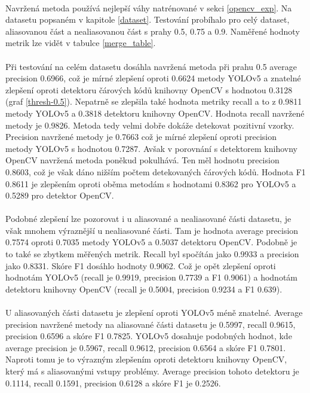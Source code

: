 \paragraph{} Navržená metoda používá nejlepší váhy natrénované v sekci \ref{opencv_exp}. Na datasetu popsaném v kapitole \ref{dataset}. Testování probíhalo pro celý dataset, aliasovanou část a nealiasovanou část s prahy 0.5, 0.75 a 0.9. Naměřené hodnoty metrik lze vidět v tabulce \ref{merge_table}.
\paragraph{} Při testování na celém datasetu dosáhla navržená metoda při prahu 0.5 average precision 0.6966, což je mírné zlepšení oproti 0.6624 metody YOLOv5 a znatelné zlepšení oproti detektoru čárových kódů knihovny OpenCV s hodnotou 0.3128 (graf \ref{thresh-0.5}). Nepatrně se zlepšila také hodnota metriky recall a to z 0.9811 metody YOLOv5 a 0.3818 detektoru knihovny OpenCV. Hodnota recall navržené metody je 0.9826. Metoda tedy velmi dobře dokáže detekovat pozitivní vzorky. Precision navržené metody je 0.7663 což je mírné zlepšení oproti precision metody YOLOv5 s hodnotou 0.7287. Avšak v porovnání s detektorem knihovny OpenCV navržená metoda poněkud pokulhává. Ten měl hodnotu precision 0.8603, což je však dáno nižším počtem detekovaných čárových kódů. Hodnota F1 0.8611 je zlepšením oproti oběma metodám s hodnotami 0.8362 pro YOLOv5 a 0.5289 pro detektor OpenCV.

\paragraph{} Podobné zlepšení lze pozorovat i u aliasované a nealiasované části datasetu, je však mnohem výraznější u nealiasované části. Tam je hodnota average precision 0.7574 oproti 0.7035 metody YOLOv5 a 0.5037 detektoru OpenCV. Podobně je to také se zbytkem měřených metrik. Recall byl spočítán jako 0.9933 a precision jako 0.8331. Skóre F1 dosáhlo hodnoty 0.9062. Což je opět zlepšení oproti hodnotám YOLOv5 (recall je 0.9919, precision 0.7739 a F1 0.9061) a hodnotám detektoru knihovny OpenCV (recall je 0.5004, precision 0.9234 a F1 0.639).

\paragraph{} U aliasovaných části datasetu je zlepšení oproti YOLOv5 méně znatelné. Average precision navržené metody na aliasované části datasetu je 0.5997, recall 0.9615, precision 0.6596 a skóre F1 0.7825. YOLOv5 dosahuje podobných hodnot, kde average precision je 0.5967, recall 0.9612, precision 0.6564 a skóre F1 0.7801. Naproti tomu je to výrazným zlepšením oproti detektoru knihovny OpenCV, který má s aliasovanými vstupy problémy. Average precision tohoto detektoru je 0.1114, recall 0.1591, precision 0.6128 a skóre F1 je 0.2526.

